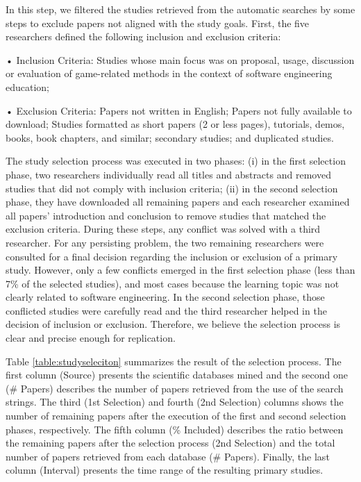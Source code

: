 In this step, we filtered the studies retrieved from the automatic searches by some steps to exclude papers not aligned with the study goals. First, the five researchers defined the following inclusion and exclusion criteria:

•	Inclusion Criteria: Studies whose main focus was on proposal, usage, discussion or evaluation of game-related methods in the context of software engineering education;

•	Exclusion Criteria: Papers not written in English; Papers not fully available to download; Studies formatted as short papers (2 or less pages), tutorials, demos, books, book chapters, and similar; secondary studies; and duplicated studies.

The study selection process was executed in two phases: (i) in the first selection phase, two researchers individually read all titles and abstracts and removed studies that did not comply with inclusion criteria; (ii) in the second selection phase, they have downloaded all remaining papers and each researcher examined all papers’ introduction and conclusion to remove studies that matched the exclusion criteria. During these steps, any conflict was solved with a third researcher. For any persisting problem, the two remaining researchers were consulted for a final decision regarding the inclusion or exclusion of a primary study. However, only a few conflicts emerged in the first selection phase (less than 7\% of the selected studies), and most cases because the learning topic was not clearly related to software engineering. In the second selection phase, those conflicted studies were carefully read and the third researcher helped in the decision of inclusion or exclusion. Therefore, we believe the selection process is clear and precise enough for replication.

Table \ref{table:studyseleciton} summarizes the result of the selection process. The first column (Source) presents the scientific databases mined and the second one (\# Papers) describes the number of papers retrieved from the use of the search strings. The third (1st Selection) and fourth (2nd Selection) columns shows the number of remaining papers after the execution of the first and second selection phases, respectively. The fifth column (\% Included) describes the ratio between the remaining papers after the selection process (2nd Selection) and the total number of papers retrieved from each database (\# Papers). Finally, the last column (Interval) presents the time range of the resulting primary studies.

